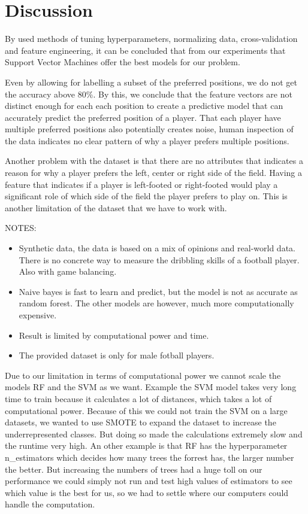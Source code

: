 \section{Discussion}

By used methods of tuning hyperparameters, normalizing data, cross-validation and feature engineering, it can be concluded that from our experiments that Support Vector Machines offer the best models for our problem. 
\par
Even by allowing for labelling a subset of the preferred positions, we do not get the accuracy above $80\%$. By this, we conclude that the feature vectors are not distinct enough for each each position to create a predictive model that can accurately predict the preferred position of a player. That each player have multiple preferred positions also potentially creates noise, human inspection of the data indicates no clear pattern of why a player prefers multiple positions.
\par
Another problem with the dataset is that there are no attributes that indicates a reason for why a player prefers the left, center or right side of the field. Having a feature that indicates if a player is left-footed or right-footed would play a significant role of which side of the field the player prefers to play on. This is another limitation of the dataset that we have to work with. 

NOTES:
\begin{itemize}
    \item Synthetic data, the data is based on a mix of opinions and real-world data. There is no concrete way to measure the dribbling skills of a football player. Also with game balancing.
    \item Naive bayes is fast to learn and predict, but the model is not as accurate as random forest. The other models are however, much more computationally expensive. 
    \item Result is limited by computational power and time.
    \item The provided dataset is only for male fotball players.
\end{itemize}



Due to our limitation in terms of computational power we cannot scale the models RF and the SVM as we want. 
Example the SVM model takes very long time to train because it calculates a lot of distances, which takes a lot of computational power. 
Because of this we could not train the SVM on a large datasets, we wanted to use SMOTE to expand the dataset to increase the underrepresented classes.
But doing so made the calculations extremely slow and the runtime very high. An other example is that RF has the hyperparameter n\_estimators which decides how many trees the forrest has, the larger number the better. 
But increasing the numbers of trees had a huge toll on our performance we could simply not run and test high values of estimators to see which value is the best for us, so we had to settle where our computers could handle the computation.




